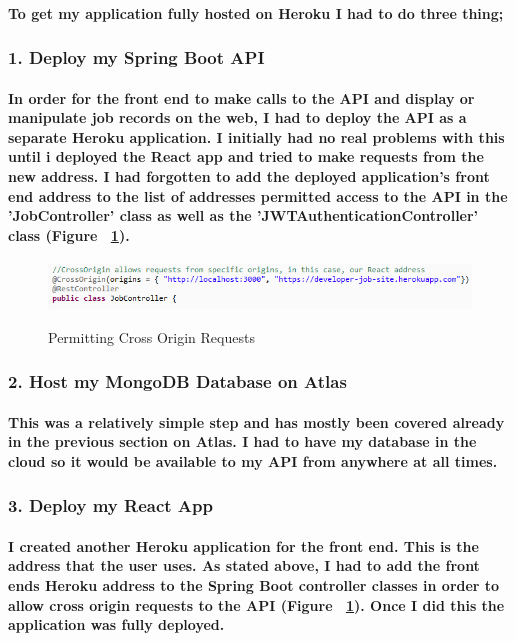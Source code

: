 \paragraph{To get my application fully hosted on Heroku I had to do three thing;}
\subsubsection{1. Deploy my Spring Boot API}
\paragraph{In order for the front end to make calls to the API and display or manipulate job records on the web, I had to deploy the API as a separate Heroku application. I initially had no real problems with this until i deployed the React app and tried to make requests from the new address. I had forgotten to add the deployed application's front end address to the list of addresses permitted access to the API in the 'JobController' class as well as the 'JWTAuthenticationController' class (Figure ~\ref{heroku1_label}). }
\begin{figure}[ht]
    \centering
    \includegraphics[scale=0.62]{Images/heroku1.png} 
    \label{heroku1_label}
    \caption{Permitting Cross Origin Requests}
\end{figure}

\subsubsection{2. Host my MongoDB Database on Atlas}
\paragraph{This was a relatively simple step and has mostly been covered already in the previous section on Atlas. I had to have my database in the cloud so it would be available to my API from anywhere at all times.}
\subsubsection{3. Deploy my React App}
\paragraph{I created another Heroku application for the front end. This is the address that the user uses. As stated above, I had to add the front ends Heroku address to the Spring Boot controller classes in order to allow cross origin requests to the API (Figure ~\ref{heroku1_label}). Once I did this the application was fully deployed. }

